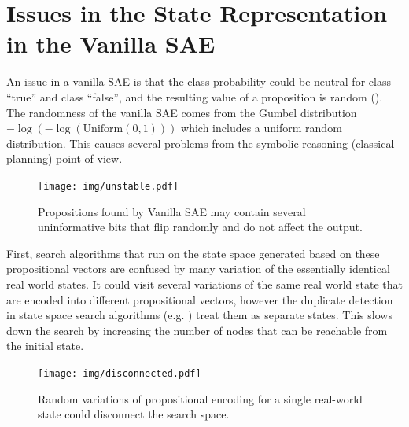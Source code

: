 

\section{Issues in the State Representation\\ in the Vanilla SAE}
\label{issues}

An issue in a vanilla SAE is that the class probability could be
neutral for class ``true'' and class ``false'', and the resulting value
of a proposition is random ().
The randomness of the vanilla SAE comes from
the Gumbel distribution $-\log (-\log (\text{Uniform}(0,1)))$ which includes
a uniform random distribution.
This causes several problems from the symbolic reasoning (classical planning) point of view.

\begin{figure}[htb]
 \centering
 \texttt{[image: img/unstable.pdf]}
 \caption{Propositions found by Vanilla SAE may contain several uninformative bits
 that flip randomly and do not affect the output.}
 \label{unstable}
\end{figure}

First, search algorithms that run on the state space generated based on these propositional vectors
are confused by many variation of the essentially identical real world states.
It could visit several variations of the same real world state that are encoded into different propositional vectors,
however the duplicate detection in state space search algorithms (e.g. \astar) treat them as separate states.
This slows down the search by increasing the number of nodes that can be reachable from the initial state.

\begin{figure}[htb]
 \centering
 \texttt{[image: img/disconnected.pdf]}
 \caption{Random variations of propositional encoding for a single real-world state could disconnect the search space.}
 \label{disconnected}
\end{figure}


